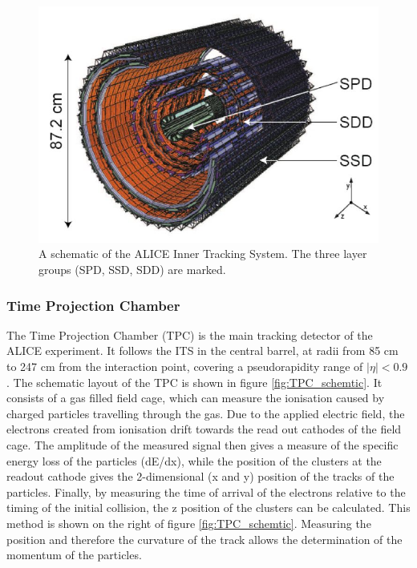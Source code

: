 \begin{figure}
    \centering
    \includegraphics[width=\textwidth]{figures/ITS_figure.jpeg}
    \caption{A schematic of the ALICE Inner Tracking System. The three layer groups (SPD, SSD, SDD) are marked. }
    \label{fig:ITS_schematic}
\end{figure}

\subsubsection{Time Projection Chamber}
The Time Projection Chamber (TPC) is the main tracking detector of the ALICE experiment. It follows the ITS in the central barrel, at radii from 85 cm to 247 cm from the interaction point, covering a pseudorapidity range of $|\eta|<0.9$. The schematic layout of the TPC is shown in figure \ref{fig:TPC_schemtic}. It consists of a gas filled field cage, which can measure the ionisation caused by charged particles travelling through the gas. Due to the applied  electric field, the electrons created from ionisation drift towards the read out cathodes of the field cage. The amplitude of the measured signal then gives a measure of the specific energy loss of the particles (dE/dx), while the position of the clusters at the readout cathode gives the 2-dimensional (x and y) position of the tracks of the particles. Finally, by measuring the time of arrival of the electrons relative to the timing of the initial collision, the z position of the clusters can be calculated. This method is shown on the right of figure \ref{fig:TPC_schemtic}. Measuring the position and therefore the curvature of the track allows the determination of the momentum of the particles. 

